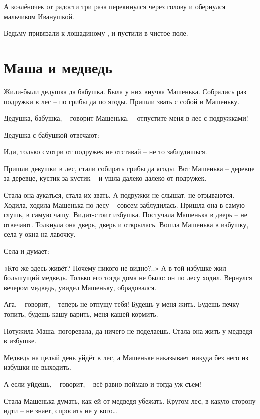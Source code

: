 А козлёночек от радости три раза перекинулся через голову и обернулся мальчиком Иванушкой.

Ведьму привязали к лошадиному , и пустили в чистое поле.

\section{Маша и медведь}
Жили-были дедушка да бабушка. Была у них внучка Машенька. Собрались раз подружки в лес -- по грибы да по ягоды. Пришли звать с собой и Машеньку.
\begin{dialogue}
    \item Дедушка, бабушка, -- говорит Машенька, -- отпустите меня в лес с подружками!
\end{dialogue}
Дедушка с бабушкой отвечают:
%
\begin{dialogue}
    \item Иди, только смотри от подружек не отставай -- не то заблудишься.
\end{dialogue}
Пришли девушки в лес, стали собирать грибы да ягоды. Вот Машенька -- деревце за деревце, кустик за кустик -- и ушла далеко-далеко от подружек.

Стала она аукаться, стала их звать. А подружки не слышат, не отзываются.
Ходила, ходила Машенька по лесу -- совсем заблудилась.
Пришла она в самую глушь, в самую чащу. Видит-стоит избушка. Постучала Машенька в дверь -- не отвечают. Толкнула она дверь, дверь и открылась.
Вошла Машенька в избушку, села у окна на лавочку.

Села и думает:

\begin{fancyquotes}
    «Кто же здесь живёт? Почему никого не видно?..» А в той избушке жил большущий медведь. Только его тогда дома не было: он по лесу ходил. Вернулся вечером медведь, увидел Машеньку, обрадовался.
\end{fancyquotes}
%
\begin{dialogue}
    \item Ага, -- говорит, -- теперь не отпущу тебя! Будешь у меня жить. Будешь печку топить, будешь кашу варить, меня кашей кормить.
\end{dialogue}

Потужила Маша, погоревала, да ничего не поделаешь. Стала она жить у медведя в избушке.

Медведь на целый день уйдёт в лес, а Машеньке наказывает никуда без него из избушки не выходить.
%
\begin{dialogue}
    \item А если уйдёшь, -- говорит, -- всё равно поймаю и тогда уж съем!
\end{dialogue}
Стала Машенька думать, как ей от медведя убежать. Кругом лес, в какую сторону идти -- не знает, спросить не у кого\dots

